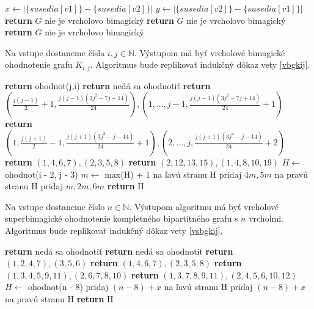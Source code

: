 \begin{algorithmic}
    \STATE $x \gets |\{susedia[v1]\} - \{susedia[v2]\}|$
    \STATE $y \gets |\{susedia[v2]\} - \{susedia[v1]\}|$
	\STATE \textbf{return} $G$ nie je vrcholovo bimagický
    \ENDIF
	\STATE \textbf{return} $G$ nie je vrcholovo bimagický
    \ENDIF
	\STATE \textbf{return} $G$ nie je vrcholovo bimagický
    \ENDIF
\ENDFOR
\end{algorithmic}


\begin{subalg} Na vstupe dostaneme čísla $i,j \in \mathbb{N}$. Výstupom má byť vrcholové bimagické ohodnotenie grafu $K_{i,j}$. Algoritmus bude replikovať indukčný dôkaz vety \ref{vbgkij}.
\end{subalg}

\begin{algorithmic}
	\STATE \textbf{return} ohodnot(j,i)
\ENDIF
{}
	\STATE \textbf{return} nedá sa ohodnotiť
\ENDIF
{}
	\STATE \textbf{return} $(\frac{j(j-1)}{2} + 1, \frac{j(j-1)(3j^2-7j+14)}{24}), (1, ... , j-1, \frac{j(j-1)(3j^2-7j+14)}{24} + 1)$
\ENDIF
{}
	\STATE \textbf{return} $(1, \frac{j(j+1)}{2} - 1, \frac{j(j+1)(3j^2-j-14)}{24} + 1), (2, ... , j, \frac{j(j+1)(3j^2-j-14)}{24} + 2)$
\ENDIF
{}
	\STATE \textbf{return} $(1, 4, 6, 7), (2, 3, 5, 8)$
\ENDIF
{}
	\STATE \textbf{return} $(2, 12, 13, 15), (1, 4, 8, 10, 19)$
\ENDIF
\STATE $H \gets$ ohodnot(i - 2, j - 3)
\STATE $m \gets$ max(H) + 1
\STATE na ľavú stranu H pridaj $4m, 5m$
\STATE na pravú stranu H pridaj $m, 2m, 6m$
\STATE \textbf{return} H
\end{algorithmic}

\begin{subalg}  Na vstupe dostaneme číslo $n \in \mathbb{N}$. Výstupom algoritmu má byť vrcholové superbimagické ohodnotenie kompletného bipartitného grafu s $n$ vrcholmi. Algoritmus bude replikovať indukčný dôkaz vety \ref{vsbgkij}.
\end{subalg}

\begin{algorithmic}
	\STATE \textbf{return} nedá sa ohodnotiť
\ENDIF
{}
	\STATE \textbf{return} nedá sa ohodnotiť
\ENDIF
{}
	\STATE \textbf{return} $(1, 2, 4, 7), (3, 5, 6)$
\ENDIF
{}
	\STATE \textbf{return} $(1, 4, 6, 7), (2, 3, 5, 8)$
\ENDIF
{}
	\STATE \textbf{return} $(1, 3, 4, 5, 9, 11), (2, 6, 7, 8, 10)$
\ENDIF
{}
	\STATE \textbf{return} $(1, 3, 7, 8, 9, 11), (2, 4, 5, 6, 10, 12)$
\ENDIF
\STATE $H \gets$ ohodnot(n - 8)
		\STATE pridaj $(n-8)+x$ na ľavú stranu H
	\ELSE
		\STATE pridaj $(n-8)+x$ na pravú stranu H
	\ENDIF
\ENDFOR
\STATE \textbf{return} H
\end{algorithmic}


